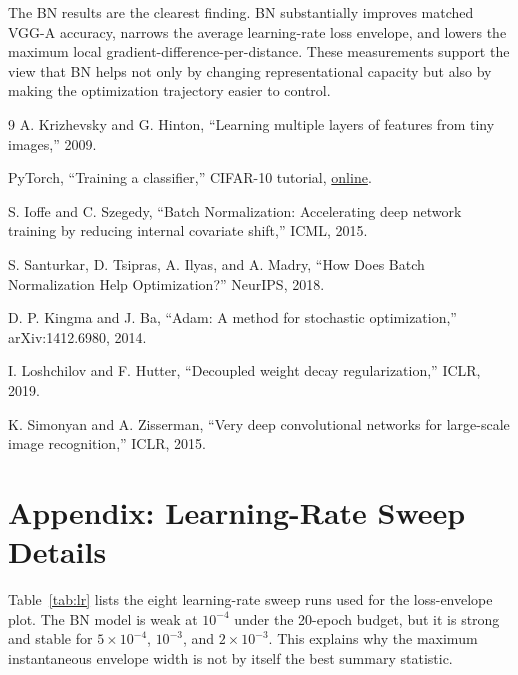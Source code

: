 \documentclass[10pt,twocolumn]{article}
\begin{document}
The BN results are the clearest finding. BN substantially improves matched VGG-A accuracy, narrows the average learning-rate loss envelope, and lowers the maximum local gradient-difference-per-distance. These measurements support the view that BN helps not only by changing representational capacity but also by making the optimization trajectory easier to control.

\begin{thebibliography}{9}
A. Krizhevsky and G. Hinton, ``Learning multiple layers of features from tiny images,'' 2009.

PyTorch, ``Training a classifier,'' CIFAR-10 tutorial, \href{https://pytorch.org/tutorials/beginner/blitz/cifar10_tutorial.html}{online}.

S. Ioffe and C. Szegedy, ``Batch Normalization: Accelerating deep network training by reducing internal covariate shift,'' ICML, 2015.

S. Santurkar, D. Tsipras, A. Ilyas, and A. Madry, ``How Does Batch Normalization Help Optimization?'' NeurIPS, 2018.

D. P. Kingma and J. Ba, ``Adam: A method for stochastic optimization,'' arXiv:1412.6980, 2014.

I. Loshchilov and F. Hutter, ``Decoupled weight decay regularization,'' ICLR, 2019.

K. Simonyan and A. Zisserman, ``Very deep convolutional networks for large-scale image recognition,'' ICLR, 2015.
\end{thebibliography}

\appendix
\section{Appendix: Learning-Rate Sweep Details}
Table~\ref{tab:lr} lists the eight learning-rate sweep runs used for the loss-envelope plot. The BN model is weak at $10^{-4}$ under the 20-epoch budget, but it is strong and stable for $5\times10^{-4}$, $10^{-3}$, and $2\times10^{-3}$. This explains why the maximum instantaneous envelope width is not by itself the best summary statistic.
\end{document}
